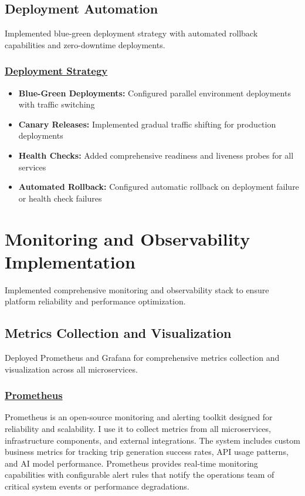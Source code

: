 \subsection{Deployment Automation}
Implemented blue-green deployment strategy with automated rollback capabilities and zero-downtime deployments.

\subsubsection*{\underline{Deployment Strategy}}
\begin{itemize}
    \item \textbf{Blue-Green Deployments:} Configured parallel environment deployments with traffic switching
    \item \textbf{Canary Releases:} Implemented gradual traffic shifting for production deployments
    \item \textbf{Health Checks:} Added comprehensive readiness and liveness probes for all services
    \item \textbf{Automated Rollback:} Configured automatic rollback on deployment failure or health check failures
\end{itemize}

\section{Monitoring and Observability Implementation}
Implemented comprehensive monitoring and observability stack to ensure platform reliability and performance optimization.

\subsection{Metrics Collection and Visualization}
Deployed Prometheus and Grafana for comprehensive metrics collection and visualization across all microservices.

\subsubsection*{\underline{Prometheus}}
Prometheus is an open-source monitoring and alerting toolkit designed for reliability and scalability. I use it to collect metrics from all microservices, infrastructure components, and external integrations. The system includes custom business metrics for tracking trip generation success rates, API usage patterns, and AI model performance. Prometheus provides real-time monitoring capabilities with configurable alert rules that notify the operations team of critical system events or performance degradations.

